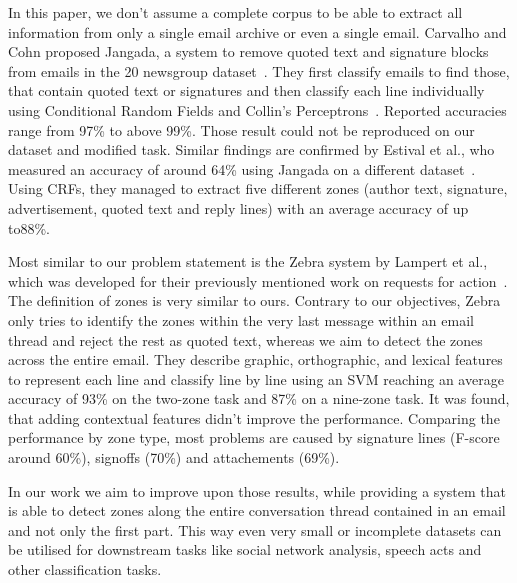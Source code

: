 \documentclass{llncs}
\begin{document}
In this paper, we don't assume a complete corpus to be able to extract all information from only a single email archive or even a single email.
Carvalho and Cohn proposed Jangada, a system to remove quoted text and signature blocks from emails in the 20 newsgroup dataset~\cite{signature,20news}.
They first classify emails to find those, that contain quoted text or signatures and then classify each line individually using Conditional Random Fields and Collin's Perceptrons~\cite{crf, cperceptron}.
Reported accuracies range from 97\% to above 99\%.
Those result could not be reproduced on our dataset and modified task.
Similar findings are confirmed by Estival et al., who measured an accuracy of around 64\% using Jangada on a different dataset~\cite{profiling}.
Using CRFs, they managed to extract five different zones (author text, signature, advertisement, quoted text and reply lines) with an average accuracy of up to88\%.

Most similar to our problem statement is the Zebra system by Lampert et al., which was developed for their previously mentioned work on requests for action~\cite{zones,rfa}.
The definition of zones is very similar to ours.
Contrary to our objectives, Zebra only tries to identify the zones within the very last message within an email thread and reject the rest as quoted text, whereas we aim to detect the zones across the entire email.
They describe graphic, orthographic, and lexical features to represent each line and classify line by line using an SVM reaching an average accuracy of 93\% on the two-zone task and 87\% on a nine-zone task.
It was found, that adding contextual features didn't improve the performance.
Comparing the performance by zone type, most problems are caused by signature lines (F-score around 60\%), signoffs (70\%) and attachements (69\%).

In our work we aim to improve upon those results, while providing a system that is able to detect zones along the entire conversation thread contained in an email and not only the first part.
This way even very small or incomplete datasets can be utilised for downstream tasks like social network analysis, speech acts and other classification tasks.



\end{document}
